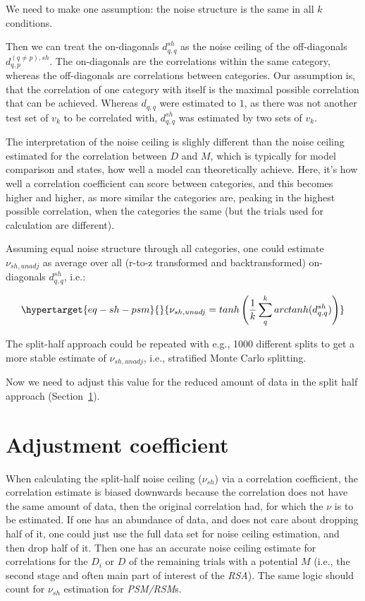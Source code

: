 \documentclass[
  letterpaper,
  DIV=11,
  numbers=noendperiod]{scrartcl}
\begin{document}
We need to make one assumption: the noise structure is the same in all
\(k\) conditions.

Then we can treat the on-diagonals \(d_{q,q}^{sh}\) as the noise ceiling
of the off-diagonals \(d_{q,p}^{(q \ne p), sh}\). The on-diagonals are
the correlations within the same category, whereas the off-diagonals are
correlations between categories. Our assumption is, that the correlation
of one category with itself is the maximal possible correlation that can
be achieved. Whereas \(d_{q,q}\) were estimated to \(1\), as there was
not another test set of \(v_k\) to be correlated with, \(d_{q,q}^{sh}\)
was estimated by two sets of \(v_k\).

The interpretation of the noise ceiling is slighly different than the
noise ceiling estimated for the correlation between \(D\) and \(M\),
which is typically for model comparison and states, how well a model can
theoretically achieve. Here, it's how well a correlation coefficient can
score between categories, and this becomes higher and higher, as more
similar the categories are, peaking in the highest possible correlation,
when the categories the same (but the trials used for calculation are
different).

Assuming equal noise structure through all categories, one could
estimate \(\nu_{sh, unadj}\) as average over all (r-to-z transformed and
backtransformed) on-diagonals \(d_{q,q}^{sh}\), i.e.:

\begin{equation}\protect\hypertarget{eq-sh-psm}{}{
\nu_{sh, unadj} = tanh \left( \frac{1}{k} \sum_q^k arctanh(d_{q,q}^{sh}) \right)
}\label{eq-sh-psm}\end{equation}

The split-half approach could be repeated with e.g., 1000 different
splits to get a more stable estimate of \(\nu_{sh, unadj}\), i.e.,
stratified Monte Carlo splitting.

Now we need to adjust this value for the reduced amount of data in the
split half approach (Section~\ref{sec-adj}).

\hypertarget{sec-adj}{%
\section{Adjustment coefficient}\label{sec-adj}}

When calculating the split-half noise ceiling (\(\nu_{sh}\)) via a
correlation coefficient, the correlation estimate is biased downwards
because the correlation does not have the same amount of data, then the
original correlation had, for which the \(\nu\) is to be estimated. If
one has an abundance of data, and does not care about dropping half of
it, one could just use the full data set for noise ceiling estimation,
and then drop half of it. Then one has an accurate noise ceiling
estimate for correlations for the \(D_i\) or \(D\) of the remaining
trials with a potential \(M\) (i.e., the second stage and often main
part of interest of the \emph{RSA}). The same logic should count for
\(\nu_{sh}\) estimation for \emph{PSM/RSM}s.
\end{document}

